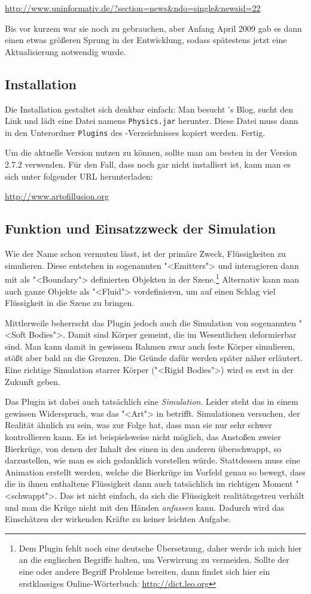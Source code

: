 \documentclass[12pt,a4paper]{scrartcl}
\begin{document}
\url{http://www.uninformativ.de/?section=news&ndo=single&newsid=22}

Bis vor kurzem war sie noch zu gebrauchen, aber Anfang April 2009 gab es
dann einen etwas größeren Sprung in der Entwicklung, sodass spätestens
jetzt eine Aktualisierung notwendig wurde.

\subsection{Installation}
Die Installation gestaltet sich denkbar einfach: Man besucht \deltor's
Blog, sucht den Link und lädt eine Datei namens \texttt{Physics.jar}
herunter. Diese Datei muss dann in den Unterordner \texttt{Plugins} des
\aoi-Verzeichnisses kopiert werden. Fertig.

Um die aktuelle Version nutzen zu können, sollte man am besten \aoi
in der Version 2.7.2 verwenden. Für den Fall, dass \aoi noch gar nicht
installiert ist, kann man es sich unter folgender URL herunterladen:

\url{http://www.artofillusion.org}

\subsection{Funktion und Einsatzzweck der Simulation}
Wie der Name schon vermuten lässt, ist der primäre Zweck, Flüssigkeiten
zu simulieren. Diese entstehen in sogenannten "<Emitters"> und
interagieren dann mit als "<Boundary"> definierten Objekten in der
Szene.\footnote{Dem Plugin fehlt noch eine deutsche Übersetzung, daher
werde ich mich hier an die englischen Begriffe halten, um Verwirrung zu
vermeiden. Sollte der eine oder andere Begriff Probleme bereiten, dann
findet sich hier ein erstklassiges Online-Wörterbuch:
\url{http://dict.leo.org}} Alternativ kann man auch ganze Objekte
als "<Fluid"> vordefinieren, um auf einen Schlag viel Flüssigkeit in die
Szene zu bringen.

Mittlerweile beherrscht das Plugin jedoch auch die Simulation von
sogenannten "<Soft Bodies">. Damit sind Körper gemeint, die im
Wesentlichen deformierbar sind. Man kann damit in gewissem Rahmen zwar
auch feste Körper simulieren, stößt aber bald an die Grenzen. Die Gründe
dafür werden später näher erläutert. Eine richtige Simulation starrer
Körper ("<Rigid Bodies">) wird es erst in der Zukunft geben.

Das Plugin ist dabei auch tatsächlich eine \emph{Simulation}. Leider
steht das in einem gewissen Widerspruch, was das "<Art"> in \aoi
betrifft. Simulationen versuchen, der Realität ähnlich zu sein, was zur
Folge hat, dass man sie nur sehr schwer kontrollieren kann. Es ist
beispielsweise nicht möglich, das Anstoßen zweier Bierkrüge, von denen
der Inhalt des einen in den anderen überschwappt, so darzustellen, wie
man es sich gedanklich vorstellen würde. Stattdessen muss eine Animation
erstellt werden, welche die Bierkrüge im Vorfeld genau so bewegt, dass
die in ihnen enthaltene Flüssigkeit dann auch tatsächlich im richtigen
Moment "<schwappt">.  Das ist nicht einfach, da sich die Flüssigkeit
realitätsgetreu verhält und man die Krüge nicht mit den Händen
\emph{anfassen} kann. Dadurch wird das Einschätzen der wirkenden Kräfte
zu keiner leichten Aufgabe.
\end{document}
